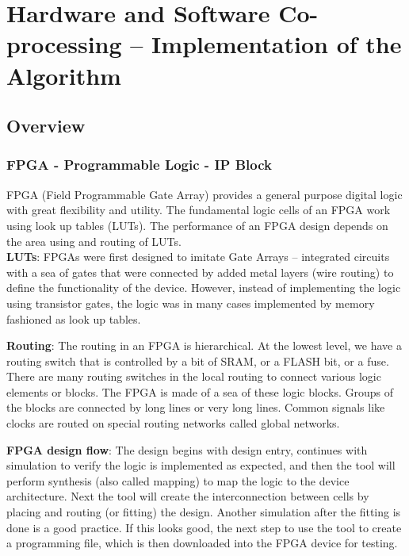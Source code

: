 \chapter{Hardware and Software Co-processing – Implementation of the Algorithm}
\label{chap:HSC}

\section{Overview}

\subsection{FPGA - Programmable Logic - IP Block}

FPGA (Field Programmable Gate Array) provides a general purpose digital logic with great flexibility and utility. The fundamental logic cells of an FPGA work using look up tables (LUTs). The performance of an FPGA design depends on the area using and routing of LUTs\cite{Dummies}. \\

\noindent \textbf{LUTs}: FPGAs were first designed to imitate Gate Arrays – integrated circuits with a sea of gates that were connected by added metal layers (wire routing) to define the functionality of the device. However, instead of implementing the logic using transistor gates, the logic was in many cases implemented by memory fashioned as look up tables. \\


\noindent \textbf{Routing}: The routing in an FPGA is hierarchical. At the lowest level, we have a routing switch that is controlled by a bit of SRAM, or a FLASH bit, or a fuse. There are many routing switches in the local routing to connect various logic elements or blocks. The FPGA is made of a sea of these logic blocks. Groups of the blocks are connected by long lines or very long lines. Common signals like clocks are routed on special routing networks called global networks. \\


\noindent \textbf{FPGA design flow}: The design begins with design entry, continues with simulation to verify the logic is implemented as expected, and then the tool will perform synthesis (also called mapping) to map the logic to the device architecture. Next the tool will create the interconnection between cells by placing and routing (or fitting) the design. Another simulation after the fitting is done is a good practice. If this looks good, the next step to use the tool to create a programming file, which is then downloaded into the FPGA device for testing\cite{Coursera}. \\


